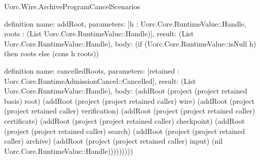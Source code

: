 \begin{lexlean}{Uorc.Wire.ArchiveProgramCancelScenarios}
\begin{semanticmodule}
definition{
  name: addRoot,
  parameters: [h : Uorc.Core.RuntimeValue::Handle, roots : (List Uorc.Core.RuntimeValue::Handle)],
  result: (List Uorc.Core.RuntimeValue::Handle),
  body: (if (Uorc.Core.RuntimeValue::isNull h) then roots else (cons h roots))
}

definition{
  name: cancelledRoots,
  parameters: [retained : Uorc.Core.RuntimeAdmissionCancel::Cancelled],
  result: (List Uorc.Core.RuntimeValue::Handle),
  body: (addRoot (project (project retained basis) root) (addRoot (project (project retained caller) wire) (addRoot (project (project retained caller) verification) (addRoot (project (project retained caller) certificate) (addRoot (project (project retained caller) checkpoint) (addRoot (project (project retained caller) search) (addRoot (project (project retained caller) archive) (addRoot (project (project retained caller) input) (nil Uorc.Core.RuntimeValue::Handle)))))))))
}


\end{semanticmodule}
\end{lexlean}
